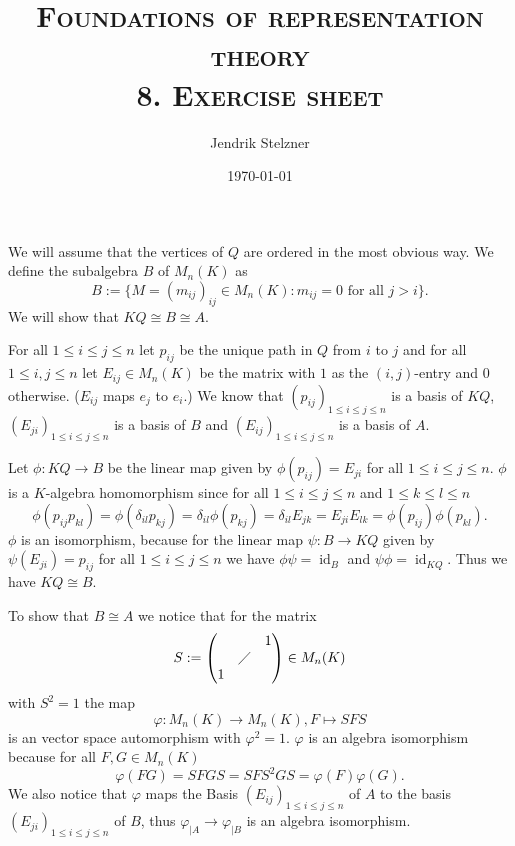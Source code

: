 \documentclass[a4paper,10pt]{article}
\title{\textsc{Foundations of representation theory \\ \Large 8. Exercise sheet}}
\author{Jendrik Stelzner}
\date{\today}
\theoremstyle{definition}
\newcommand{\id}{\operatorname{id}}
\begin{document}
\maketitle





\section{}
We will assume that the vertices of $Q$ are ordered in the most obvious way. We define the subalgebra $B$ of $M_n(K)$ as
\[
 B := \{M = (m_{ij})_{ij} \in M_n(K) : m_{ij} = 0 \text{ for all } j > i \}.
\]
We will show that $KQ \cong B \cong A$.

For all $1 \leq i \leq j \leq n$  let $p_{ij}$ be the unique path in $Q$ from $i$ to $j$ and for all $1 \leq i, j \leq n$ let $E_{ij} \in M_n(K)$ be the matrix with $1$ as the $(i,j)$-entry and $0$ otherwise. ($E_{ij}$ maps $e_j$ to $e_i$.) We know that $(p_{ij})_{1 \leq i \leq j \leq n}$ is a basis of $KQ$, $(E_{ji})_{1 \leq i \leq j \leq n}$ is a basis of $B$ and $(E_{ij})_{1 \leq i \leq j \leq n}$ is a basis of $A$.

Let $\phi : KQ \rightarrow B$ be the linear map given by $\phi(p_{ij}) = E_{ji}$ for all $1 \leq i \leq j \leq n$. $\phi$ is a $K$-algebra homomorphism since for all $1 \leq i \leq j \leq n$ and $1 \leq k \leq l \leq n$
\begin{equation*}
 \phi(p_{ij} p_{kl})
 = \phi(\delta_{il} p_{kj})
 = \delta_{il} \phi(p_{kj})
 = \delta_{il} E_{jk}
 = E_{ji} E_{lk}
 = \phi(p_{ij}) \phi(p_{kl}).
\end{equation*}
$\phi$ is an isomorphism, because for the linear map $\psi: B \rightarrow KQ$ given by $\psi(E_{ji}) = p_{ij}$ for all $1 \leq i \leq j \leq n$ we have $\phi \psi = \id_B$ and $\psi \phi = \id_{KQ}$. Thus we have $KQ \cong B$.

To show that $B \cong A$ we notice that for the matrix
\[
 S :=
 \begin{pmatrix}
    &         & 1 \\
    & \diagup &   \\
  1 &         & 
 \end{pmatrix}
 \in M_n(K)
\]
with $S^2 = 1$ the map
\[
 \varphi : M_n(K) \rightarrow M_n(K), F \mapsto SFS
\]
is an vector space automorphism with $\varphi^2 = 1$. $\varphi$ is an algebra isomorphism because for all $F,G \in M_n(K)$
\[
 \varphi(FG) = SFGS = SFS^2GS = \varphi(F)\varphi(G).
\]
We also notice that $\varphi$ maps the Basis $(E_{ij})_{1 \leq i \leq j \leq n}$ of $A$ to the basis $(E_{ji})_{1 \leq i \leq j \leq n}$ of $B$, thus $\varphi_{|A} \rightarrow \varphi_{|B}$ is an algebra isomorphism.
\end{document}
